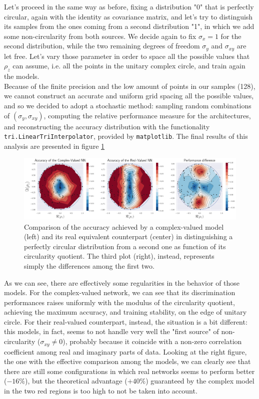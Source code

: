 \documentclass[../main.tex]{subfiles}
\begin{document}
Let's proceed in the same way as before, fixing a distribution "0" that is perfectly circular, again with the identity as covariance matrix, and let's try to distinguish its samples from the ones coming from a second distribution "1", in which we add some non-circularity from both sources. We decide again to fix $\sigma_x=1$ for the second distribution, while the two remaining degrees of freedom $\sigma_y$ and $\sigma_{xy}$ are let free. Let's vary those parameter in order to space all the possible values that $\rho_z$ can assume, i.e. all the points in the unitary complex circle, and train again the models.\\
Because of the finite precision and the low amount of points in our samples (128), we cannot construct an accurate and uniform grid spacing all the possible values, and so we decided to adopt a stochastic method: sampling random combinations of $(\sigma_y, \sigma_{xy})$, computing the relative performance measure for the architectures, and reconstructing the accuracy distribution with the functionality \texttt{tri.LinearTriInterpolator}, provided by \texttt{matplotlib}. The final results of this analysis are presented in figure \ref{fig:noncirc_comparison_final}
\begin{figure}[!ht]
	\centering
	\includegraphics[width=\textwidth]{pictures/noncirc_comparison_final}
	\caption{Comparison of the accuracy achieved by a complex-valued model (left) and its real equivalent counterpart (center) in distinguishing a perfectly circular distribution from a second one as function of its circularity quotient. The third plot (right), instead, represents simply the differences among the first two.}
	\label{fig:noncirc_comparison_final}
\end{figure}

As we can see, there are effectively some regularities in the behavior of those models. For the complex-valued network, we can see that its discrimination performances raises uniformly with the modulus of the circularity quotient, achieving the maximum accuracy, and training stability, on the edge of unitary circle. For their real-valued counterpart, instead, the situation is a bit different: this models, in fact, seems to not handle very well the "first source" of non-circularity ($\sigma_{xy}\neq 0$), probably because it coincide with a non-zero correlation coefficient among real and imaginary parts of data. Looking at the right figure, the one with the effective comparison among the models, we can clearly see that there are still some configurations in which real networks seems to perform better ($-16\%$), but the theoretical advantage ($+40\%$) guaranteed by the complex model in the two red regions is too high to not be taken into account.



	
	
	
\end{document}
